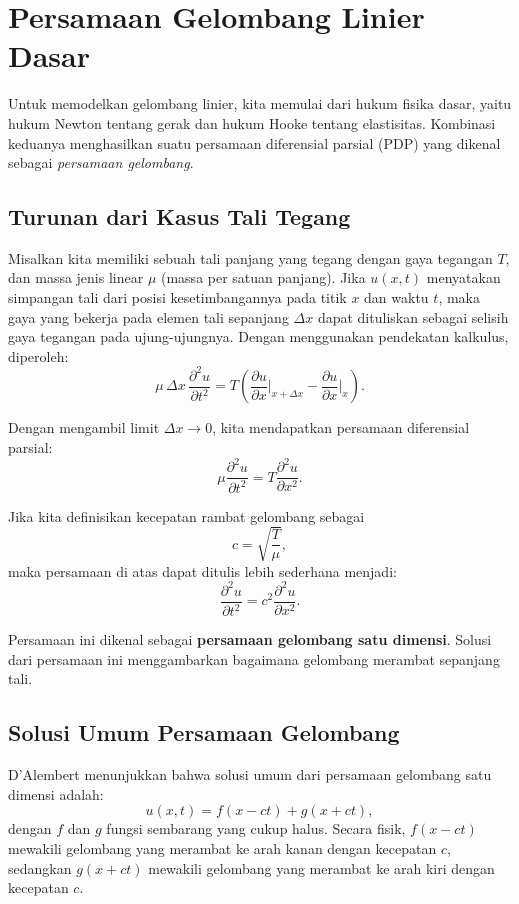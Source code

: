 \documentclass{bukumjh}
\begin{document}
\section{Persamaan Gelombang Linier Dasar}

Untuk memodelkan gelombang linier, kita memulai dari hukum fisika dasar, yaitu hukum Newton tentang gerak dan hukum Hooke tentang elastisitas. 
Kombinasi keduanya menghasilkan suatu persamaan diferensial parsial (PDP) yang dikenal sebagai \emph{persamaan gelombang}.

\subsection{Turunan dari Kasus Tali Tegang}

Misalkan kita memiliki sebuah tali panjang yang tegang dengan gaya tegangan $T$, dan massa jenis linear $\mu$ (massa per satuan panjang). 
Jika $u(x,t)$ menyatakan simpangan tali dari posisi kesetimbangannya pada titik $x$ dan waktu $t$, maka gaya yang bekerja pada elemen tali sepanjang $\Delta x$ dapat dituliskan sebagai selisih gaya tegangan pada ujung-ujungnya. 
Dengan menggunakan pendekatan kalkulus, diperoleh:
\[
\mu \, \Delta x \, \frac{\partial^2 u}{\partial t^2} 
= T \left( \frac{\partial u}{\partial x}\bigg|_{x+\Delta x} - \frac{\partial u}{\partial x}\bigg|_{x} \right).
\]

Dengan mengambil limit $\Delta x \to 0$, kita mendapatkan persamaan diferensial parsial:
\[
\mu \frac{\partial^2 u}{\partial t^2} = T \frac{\partial^2 u}{\partial x^2}.
\]

Jika kita definisikan kecepatan rambat gelombang sebagai
\[
c = \sqrt{\frac{T}{\mu}},
\]
maka persamaan di atas dapat ditulis lebih sederhana menjadi:
\begin{equation}
\frac{\partial^2 u}{\partial t^2} = c^2 \frac{\partial^2 u}{\partial x^2}.
\end{equation}

Persamaan ini dikenal sebagai \textbf{persamaan gelombang satu dimensi}. 
Solusi dari persamaan ini menggambarkan bagaimana gelombang merambat sepanjang tali.

\subsection*{Solusi Umum Persamaan Gelombang}
D’Alembert menunjukkan bahwa solusi umum dari persamaan gelombang satu dimensi adalah:
\[
u(x,t) = f(x-ct) + g(x+ct),
\]
dengan $f$ dan $g$ fungsi sembarang yang cukup halus. 
Secara fisik, $f(x-ct)$ mewakili gelombang yang merambat ke arah kanan dengan kecepatan $c$, sedangkan $g(x+ct)$ mewakili gelombang yang merambat ke arah kiri dengan kecepatan $c$. 
\end{document}
